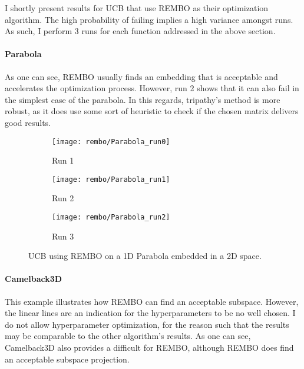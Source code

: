I shortly present results for UCB that use REMBO as their optimization algorithm.
The high probability of failing implies a high variance amongst runs. 
As such, I perform 3 runs for each function addressed in the above section.

\paragraph{Parabola}
As one can see, REMBO usually finds an embedding that is acceptable and accelerates the optimization process.
However, run 2 shows that it can also fail in the simplest case of the parabola.
In this regards, tripathy's method is more robust, as it does use some sort of heuristic to check if the chosen matrix delivers good results.


\begin{figure}[H]
\center
    \begin{subfigure}[b]{0.30\textwidth}
        \texttt{[image: rembo/Parabola\_run0]}
        \label{fig:gull}
         \caption{Run 1}
    \end{subfigure}
        \begin{subfigure}[b]{0.30\textwidth}
        \texttt{[image: rembo/Parabola\_run1]}
        \label{fig:gull}
        \caption{Run 2}
    \end{subfigure}
    \begin{subfigure}[b]{0.30\textwidth}
        \texttt{[image: rembo/Parabola\_run2]}
        \label{fig:gull}
               \caption{Run 3}
    \end{subfigure}
        \caption{UCB using REMBO on a 1D Parabola embedded in a 2D space.
    }\label{fig:animals}
\end{figure}

\paragraph{Camelback3D}
This example illustrates how REMBO can find an acceptable subspace.
However, the linear lines are an indication for the hyperparameters to be no well chosen. 
I do not allow hyperparameter optimization, for the reason such that the results may be comparable to the other algorithm's results.
As one can see, Camelback3D also provides a difficult for REMBO, although REMBO does find an acceptable subspace projection.

